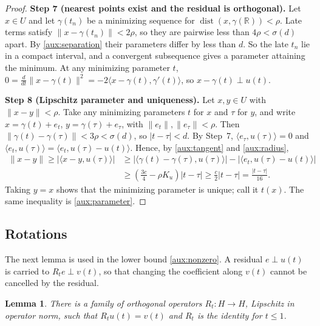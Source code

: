 \documentclass[11pt]{article}
\newcommand{\R}{\mathbb R}
\newcommand{\norm}[1]{\lVert #1\rVert}
\newcommand{\ip}[2]{\langle #1,#2\rangle}
\DeclareMathOperator{\dist}{dist}
\newtheorem{lemma}[theorem]{Lemma}
\theoremstyle{definition}
\numberwithin{equation}{section}
\newcommand{\step}[1]{\par\smallskip\noindent\textbf{Step #1.}\enspace}
\begin{document}
\begin{proof}
\step{7 (nearest points exist and the residual is orthogonal)}
Let \(x\in U\) and let \(\gamma(t_n)\) be a minimizing sequence for
\(\dist(x,\gamma(\R))<\rho\). Late terms satisfy
\(\norm{x-\gamma(t_n)}<2\rho\), so they are pairwise less than
\(4\rho<\sigma(d)\) apart. By \eqref{aux:separation} their parameters
differ by less than \(d\). So the late \(t_n\) lie in a compact interval,
and a convergent subsequence gives a parameter attaining the minimum.
At any minimizing parameter \(t\),
\(0=\frac{d}{dt}\norm{x-\gamma(t)}^2=-2\ip{x-\gamma(t)}{\gamma'(t)}\),
so \(x-\gamma(t)\perp u(t)\).

\step{8 (Lipschitz parameter and uniqueness)}
Let \(x,y\in U\) with \(\norm{x-y}<\rho\). Take any minimizing parameters
\(t\) for \(x\) and \(\tau\) for \(y\), and write \(x=\gamma(t)+e_t\),
\(y=\gamma(\tau)+e_\tau\), with \(\norm{e_t},\norm{e_\tau}<\rho\). Then
\(\norm{\gamma(t)-\gamma(\tau)}<3\rho<\sigma(d)\), so \(|t-\tau|<d\).
By Step~7, \(\ip{e_\tau}{u(\tau)}=0\) and
\(\ip{e_t}{u(\tau)}=\ip{e_t}{u(\tau)-u(t)}\). Hence, by
\eqref{aux:tangent} and \eqref{aux:radius},
\begin{align*}
 \norm{x-y}\ge|\ip{x-y}{u(\tau)}|
 &\ge |\ip{\gamma(t)-\gamma(\tau)}{u(\tau)}|
       -|\ip{e_t}{u(\tau)-u(t)}|\\
 &\ge\left(\frac{3c}{4}-\rho K_u\right)|t-\tau|
 \ge\frac c2|t-\tau|=\frac{|t-\tau|}{16}.
\end{align*}
Taking \(y=x\) shows that the minimizing parameter is unique; call it
\(t(x)\). The same inequality is \eqref{aux:parameter}.
\end{proof}

\subsection{Rotations}

The next lemma is used in the lower bound \eqref{aux:nonzero}. A residual
\(e\perp u(t)\) is carried to \(R_te\perp v(t)\), so that changing the
coefficient along \(v(t)\) cannot be cancelled by the residual.

\begin{lemma}\label{aux:rotation}
There is a family of orthogonal operators \(R_t:H\to H\), Lipschitz
in operator norm, such that \(R_tu(t)=v(t)\) and \(R_t\) is the identity
for \(t\le1\).
\end{lemma}
\end{document}
